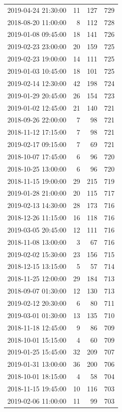 \begin{tabular}{lrrr}
2019-04-24 21:30:00 & 11 & 127 & 729 \\
2018-08-20 11:00:00 & 8 & 112 & 728 \\
2019-01-08 09:45:00 & 18 & 141 & 726 \\
2019-02-23 23:00:00 & 20 & 159 & 725 \\
2019-02-23 19:00:00 & 14 & 111 & 725 \\
2019-01-03 10:45:00 & 18 & 101 & 725 \\
2019-02-14 12:30:00 & 42 & 198 & 724 \\
2019-01-29 20:45:00 & 26 & 154 & 723 \\
2019-01-02 12:45:00 & 21 & 140 & 721 \\
2018-09-26 22:00:00 & 7 & 98 & 721 \\
2018-11-12 17:15:00 & 7 & 98 & 721 \\
2019-02-17 09:15:00 & 7 & 69 & 721 \\
2018-10-07 17:45:00 & 6 & 96 & 720 \\
2018-10-25 13:00:00 & 6 & 96 & 720 \\
2018-11-15 19:00:00 & 29 & 215 & 719 \\
2019-01-28 21:00:00 & 20 & 115 & 717 \\
2019-02-13 14:30:00 & 28 & 173 & 716 \\
2018-12-26 11:15:00 & 16 & 118 & 716 \\
2019-03-05 20:45:00 & 12 & 111 & 716 \\
2018-11-08 13:00:00 & 3 & 67 & 716 \\
2019-02-02 15:30:00 & 23 & 156 & 715 \\
2018-12-15 13:15:00 & 5 & 57 & 714 \\
2018-11-25 12:00:00 & 29 & 184 & 713 \\
2018-09-07 01:30:00 & 12 & 130 & 713 \\
2019-02-12 20:30:00 & 6 & 80 & 711 \\
2019-03-01 01:30:00 & 13 & 135 & 710 \\
2018-11-18 12:45:00 & 9 & 86 & 709 \\
2018-10-01 15:15:00 & 4 & 60 & 709 \\
2019-01-25 15:45:00 & 32 & 209 & 707 \\
2019-01-31 13:00:00 & 36 & 200 & 706 \\
2018-10-01 18:15:00 & 4 & 58 & 704 \\
2018-11-15 19:45:00 & 10 & 116 & 703 \\
2019-02-06 11:00:00 & 11 & 99 & 703 \\

\end{tabular}
